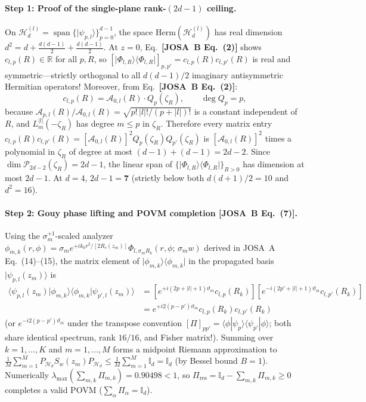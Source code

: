 \documentclass[10pt,letterpaper]{article}
\newcommand{\braket}[2]{\langle #1 | #2 \rangle}
\newcommand{\ket}[1]{\lvert #1 \rangle}
\newcommand{\bra}[1]{\langle #1 \rvert}
\newcommand{\abs}[1]{\lvert #1 \rvert}
\newcommand{\josb}[1]{\textbf{[JOSA~B Eq.~(#1)]}}
\numberwithin{equation}{section}
\begin{document}
\paragraph*{Step 1: Proof of the single-plane rank-$(2d-1)$ ceiling.}
On $\mathcal{H}_d^{(l)} = \operatorname{span}\{\ket{\psi_{p,l}}\}_{p=0}^{d-1}$, the space $\mathrm{Herm}(\mathcal{H}_d^{(l)})$ has real dimension $d^2 = d + \frac{d(d-1)}{2} + \frac{d(d-1)}{2}$. At $z = 0$, Eq.~\josb{2} shows $c_{l,p}(R) \in \mathbb{R}$ for all $p, R$, so $[\ket{\Phi_{l,R}}\bra{\Phi_{l,R}}]_{p,p'} = c_{l,p}(R) c_{l,p'}(R)$ is real and symmetric---strictly orthogonal to all $d(d-1)/2$ imaginary antisymmetric Hermitian operators! Moreover, from Eq.~\josb{2}:
\begin{equation}
  c_{l,p}(R) = \mathcal{A}_{0,l}(R)\cdot Q_p(\zeta_R), \qquad \deg Q_p = p,
\end{equation}
because $\mathcal{A}_{p,l}(R)/\mathcal{A}_{0,l}(R) = \sqrt{p!\,\abs{l}!/(p+\abs{l})!}$ is a constant independent of $R$, and $L_m^{\abs{l}}(-\zeta_R)$ has degree $m \le p$ in $\zeta_R$. Therefore every matrix entry $c_{l,p}(R) c_{l,p'}(R) = [\mathcal{A}_{0,l}(R)]^2 Q_p(\zeta_R) Q_{p'}(\zeta_R)$ is $[\mathcal{A}_{0,l}(R)]^2$ times a polynomial in $\zeta_R$ of degree at most $(d-1)+(d-1) = 2d - 2$. Since $\dim\mathcal{P}_{2d-2}(\zeta_R) = 2d - 1$, the linear span of $\{\ket{\Phi_{l,R}}\bra{\Phi_{l,R}}\}_{R>0}$ has dimension at most $2d - 1$. At $d = 4$, $2d - 1 = \mathbf{7}$ (strictly below both $d(d+1)/2 = 10$ and $d^2 = 16$).

\paragraph*{Step 2: Gouy phase lifting and POVM completion \josb{7}.}
Using the $\sigma_m^{+1}$-scaled analyzer $\phi_{m,k}(r,\phi) = \sigma_m e^{+ik_0 r^2/[2R_c(z_m)]}\Phi_{l,\sigma_m R_k}(r,\phi;\,\sigma_m w)$ derived in JOSA~A Eq.~(14)--(15), the matrix element of $\ket{\phi_{m,k}}\bra{\phi_{m,k}}$ in the propagated basis $\ket{\psi_{p,l}(z_m)}$ is
\begin{align}
  \bra{\psi_{p,l}(z_m)}\phi_{m,k}\rangle\langle\phi_{m,k}\ket{\psi_{p',l}(z_m)} &= \left[e^{+i(2p+\abs{l}+1)\vartheta_m} c_{l,p}(R_k)\right]\left[e^{-i(2p'+\abs{l}+1)\vartheta_m} c_{l,p'}(R_k)\right] \nonumber \\
  &= e^{+i 2(p-p')\vartheta_m} c_{l,p}(R_k) c_{l,p'}(R_k)
\end{align}
(or $e^{-i 2(p-p')\vartheta_m}$ under the transpose convention $[\Pi]_{pp'} = \braket{\phi}{\psi_p}\braket{\psi_{p'}}{\phi}$; both share identical spectrum, rank $16/16$, and Fisher matrix!). Summing over $k = 1,\dots,K$ and $m = 1,\dots,M$ forms a midpoint Riemann approximation to $\frac{1}{M}\sum_{m=1}^M P_{\mathcal{H}_d} S_w(z_m) P_{\mathcal{H}_d} \le \frac{1}{M}\sum_{m=1}^M \mathbb{I}_d = \mathbb{I}_d$ (by Bessel bound $B = 1$). Numerically $\lambda_{\max}(\sum_{m,k}\Pi_{m,k}) = 0.90498 < 1$, so $\Pi_{\mathrm{res}} = \mathbb{I}_d - \sum_{m,k}\Pi_{m,k} \ge 0$ completes a valid POVM ($\sum_\alpha \Pi_\alpha = \mathbb{I}_d$).
\end{document}
